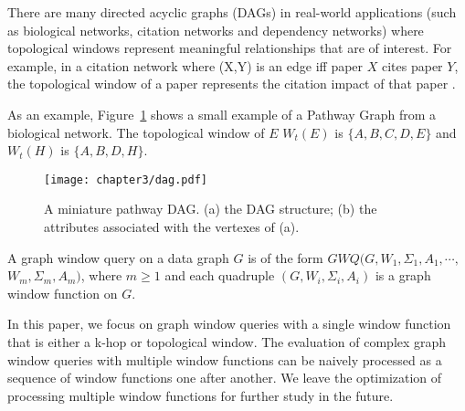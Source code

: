 There are many directed acyclic graphs (DAGs) in real-world applications (such as biological networks, citation networks and dependency networks)
where topological windows represent meaningful relationships that are of interest.
For example, in a citation network where (X,Y) is an edge  iff paper $X$ cites paper $Y$, 
the topological window of a paper represents the citation impact of that paper \cite{campanario2011empirical,holsapple2003citation,ma2008bringing}.

As an example, Figure~\ref{fig:topological} shows a small example of a Pathway Graph from a biological network. 
The topological window of $E$ $W_t(E)$ is $\{A, B, C, D, E\}$ and $W_t(H)$ is $\{A, B, D, H\}$.


\begin{figure}[h]
\centering
 \texttt{[image: chapter3/dag.pdf]}
	\caption{A miniature pathway DAG. (a) the DAG structure; (b) the attributes associated with the vertexes of (a).}
	\label{fig:topological}
\end{figure}

\begin{definition} 
A graph window query on a data graph $G$ is of the form
$GWQ(G, W_1, \Sigma_1, A_1,\cdots,$ \\
$W_m, \Sigma_m, A_m)$, where $m \geq 1$
and
each quadruple $(G, W_i,\Sigma_i,A_i)$ is a graph window function on $G$.
\end{definition}
In this paper, we focus on graph window queries with a single window 
function that is either a k-hop or topological window. 
The evaluation of complex graph window queries with multiple window 
functions can be naively processed as a sequence of window functions one
after another. 
We leave the optimization of processing multiple
window functions for further study in the future.

